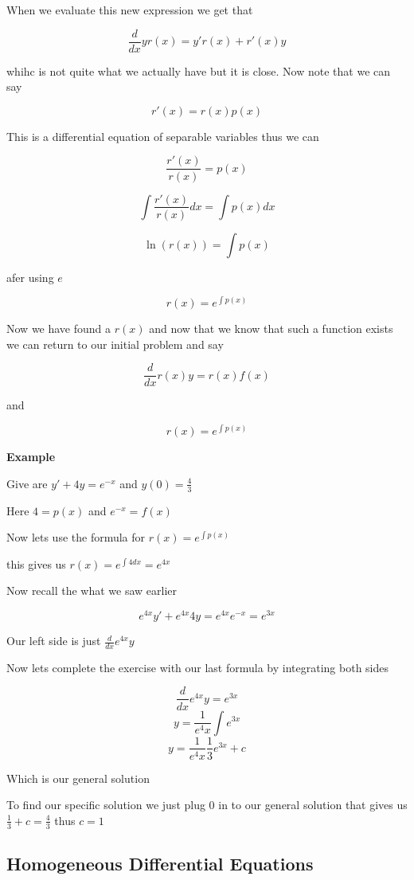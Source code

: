 When we evaluate this new expression we get that

\[\frac{d}{dx} y r(x) = y'r(x) + r'(x)y\]

whihc is not quite what we actually have but it is close. Now note that we can say

\[r'(x) = r(x)p(x)\]

This is a differential equation of separable variables thus we can

\[\frac{r'(x)}{r(x)} = p(x)\]

\[\int \frac{r'(x)}{r(x)}dx = \int p(x)dx\]

\[ \ln(r(x)) = \int p(x)\]

afer using \(e\)

\[ r(x) = e^{\int p(x)}\]

Now we have found a \(r(x)\) and now that we know that such a function exists we can return 
to our initial problem and say

\[\frac{d}{dx}r(x)y = r(x)f(x)\]
\begin{center}
\end{center}

and 

\[r(x) = e^{\int p (x) }\]

\textbf{Example}

Give are \(y' + 4y = e^{-x}\) and \(y(0) = \frac{4}{3}\)

Here \(4 = p(x)\) and \(e^{-x} = f(x)\)

Now lets use the formula for \(r(x) = e^{\int p (x)}\)

this gives us \(r(x) = e^{\int 4dx} = e^{4x}\)

Now recall the what we saw earlier

\[e^{4x}y' + e^{4x}4y = e^{4x}e^{-x} = e^{3x}\]

Our left side is just \(\frac{d}{dx} e^{4x}y\)

Now lets complete the exercise with our last formula by integrating both sides

\[\frac{d}{dx} e^{4x}y = e^{3x}\]
\[y = \frac{1}{e^4x}\int e^{3x}\]
\[y = \frac{1}{e^4x} \frac{1}{3}e^{3x} + c\]

Which is our general solution

To find our specific solution we just plug 0 in to our general solution that gives us
\(\frac{1}{3} + c = \frac{4}{3}\) thus \(c = 1\)

\subsection{Homogeneous Differential Equations}

